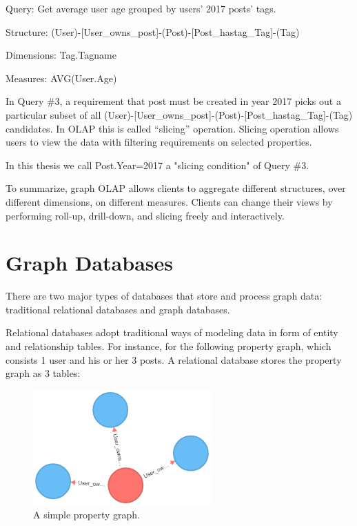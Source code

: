 Query: 		Get average user age grouped by users’ 2017 posts’ tags. 

Structure:	(User)-[User\_owns\_post]-(Post)-[Post\_hastag\_Tag]-(Tag)

Dimensions:	{Tag.Tagname}

Measures:	{AVG(User.Age)}
 
In Query \#3, a requirement that post must be created in year 2017 picks out a particular subset of  all (User)-[User\_owns\_post]-(Post)-[Post\_hastag\_Tag]-(Tag) candidates. In OLAP this is called “slicing” operation. Slicing operation allows users to view the data with filtering requirements on selected properties. 
 
In this thesis we call {Post.Year=2017} a "slicing condition" of Query \#3.
 
To summarize, graph OLAP allows clients to aggregate different structures, over different dimensions, on different measures. Clients can change their views by performing roll-up, drill-down, and slicing freely and interactively.


\section{Graph Databases}


There are two major types of databases that store and process graph data: traditional relational databases and graph databases. 
 
Relational databases adopt traditional ways of modeling data in form of entity and relationship tables. For instance, for the following property graph, which consists 1 user and his or her 3 posts. A relational database stores the property graph as 3 tables:

\begin {figure}[H]
\centering
\includegraphics[scale=0.9]{pic/4.png}
\caption{A simple property graph.}
\end{figure}

